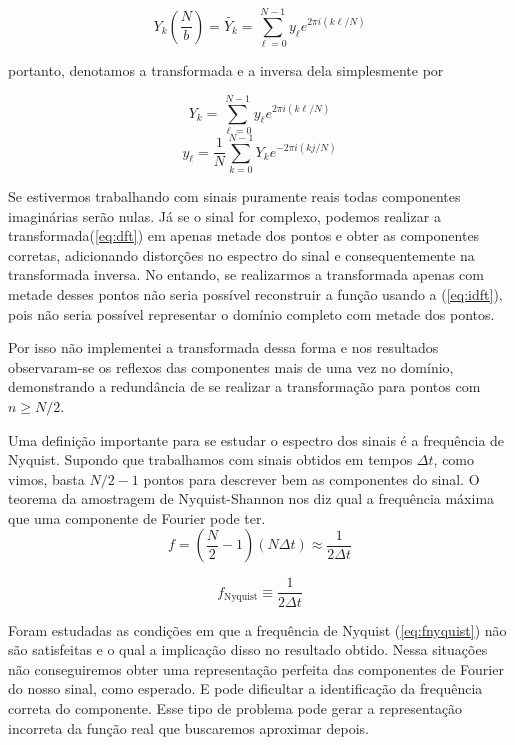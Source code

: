 \documentclass[a4paper, 11pt]{article}
\begin{document}
\[ Y_k \left( \frac{N}{b} \right) = \tilde{Y_k} = \sum_{\ell = 0}^{N-1} y_\ell e^{2\pi i \left( k\ell/N \right) } \]

portanto, denotamos a transformada e a inversa dela simplesmente por 

\begin{equation}
  Y_k = \sum_{\ell = 0}^{N-1} y_\ell e^{2\pi i \left( k\ell/N \right)}
  \label{eq:dft} 
\end{equation}
\begin{equation}
  y_\ell = \frac{1}{N} \sum_{k=0}^{N-1} Y_k e^{-2\pi i \left( kj/N \right)}
  \label{eq:idft} 
\end{equation}

Se estivermos trabalhando com sinais puramente reais todas componentes imaginárias serão
nulas. Já se o sinal for complexo, podemos realizar a transformada(\ref{eq:dft}) em apenas
metade dos pontos e obter as componentes corretas, adicionando distorções no espectro do sinal e
consequentemente na transformada inversa. No entando, se realizarmos a transformada apenas com metade
desses pontos não seria possível reconstruir a função usando a (\ref{eq:idft}), pois não seria
possível representar o domínio completo com metade dos pontos.


Por isso não implementei a transformada dessa forma e nos resultados observaram-se os reflexos das
componentes mais de uma vez no domínio, demonstrando a redundância de se realizar a transformação
para pontos com $n \geq N/2$.


Uma definição importante para se estudar o espectro dos sinais é a frequência de Nyquist. Supondo
que trabalhamos com sinais obtidos em tempos \( \Delta t \), como vimos, basta $N/2 - 1$ pontos para
descrever bem as componentes do sinal. O teorema da amostragem de Nyquist-Shannon nos diz qual a
frequência máxima que uma componente de Fourier pode ter.
\[ f =  \left( \frac{N}{2} - 1 \right) \left( N \Delta t\right) \approx \frac{1}{2\Delta t}\]

\begin{equation}
  f_{\text{Nyquist}} \equiv \frac{1}{2 \Delta t}
  \label{eq:fnyquist}
\end{equation}


Foram estudadas as condições em que a frequência de Nyquist (\ref{eq:fnyquist}) não são
satisfeitas e o qual a implicação disso no resultado obtido. Nessa situações não conseguiremos
obter uma representação perfeita das componentes de Fourier do nosso sinal, como esperado.
E pode dificultar a identificação da frequência correta do componente. Esse tipo de problema pode
gerar a representação incorreta da função real que buscaremos aproximar depois.
\end{document}
